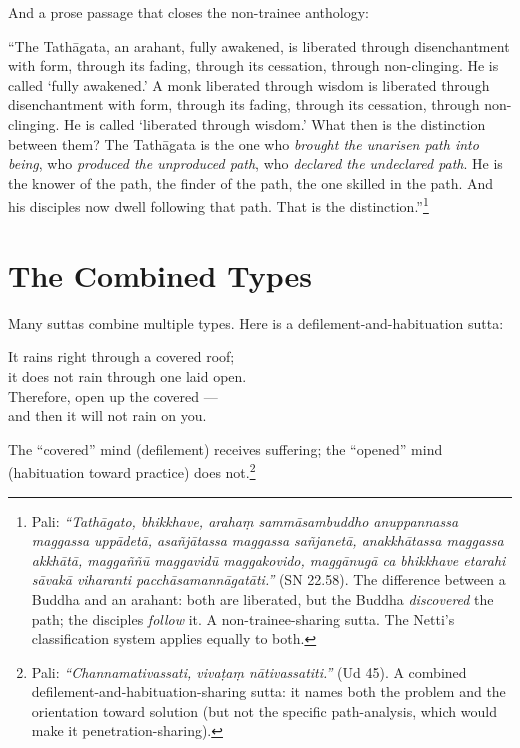 \noindent And a prose passage that closes the non-trainee anthology:

``The Tathāgata, an arahant, fully awakened, is liberated through disenchantment with form, through its fading, through its cessation, through non-clinging. He is called `fully awakened.' A monk liberated through wisdom is liberated through disenchantment with form, through its fading, through its cessation, through non-clinging. He is called `liberated through wisdom.' What then is the distinction between them? The Tathāgata is the one who \textit{brought the unarisen path into being}, who \textit{produced the unproduced path}, who \textit{declared the undeclared path}. He is the knower of the path, the finder of the path, the one skilled in the path. And his disciples now dwell following that path. That is the distinction.''\footnote{Pali: \textit{``Tathāgato, bhikkhave, arahaṃ sammāsambuddho anuppannassa maggassa uppādetā, asañjātassa maggassa sañjanetā, anakkhātassa maggassa akkhātā, maggaññū maggavidū maggakovido, maggānugā ca bhikkhave etarahi sāvakā viharanti pacchāsamannāgatāti.''} (SN 22.58). The difference between a Buddha and an arahant: both are liberated, but the Buddha \textit{discovered} the path; the disciples \textit{follow} it. A non-trainee-sharing sutta. The Netti's classification system applies equally to both.}

\section*{The Combined Types}

Many suttas combine multiple types. Here is a defilement-and-habituation sutta:

\begin{versebox}
It rains right through a covered roof;\\
it does not rain through one laid open.\\
Therefore, open up the covered ---\\
and then it will not rain on you.
\end{versebox}

\noindent The ``covered'' mind (defilement) receives suffering; the ``opened'' mind (habituation toward practice) does not.\footnote{Pali: \textit{``Channamativassati, vivaṭaṃ nātivassatiti.''} (Ud 45). A combined defilement-and-habituation-sharing sutta: it names both the problem and the orientation toward solution (but not the specific path-analysis, which would make it penetration-sharing).}

